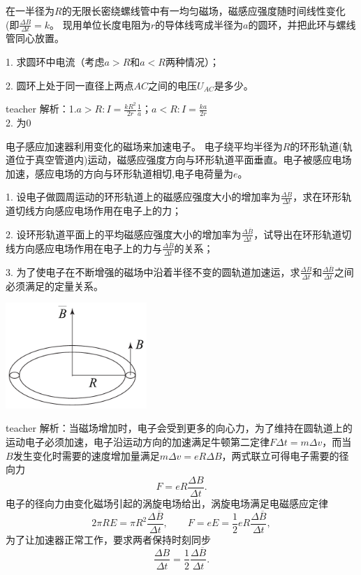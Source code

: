 \begin{example}
在一半径为$R$的无限长密绕螺线管中有一均匀磁场，磁感应强度随时间线性变化(即$\frac{\Delta B}{\Delta t} = k$。
现用单位长度电阻为$r $的导体线弯成半径为$a$的圆环，并把此环与螺线管同心放置。

1. 求圆环中电流（考虑$a>R $和$a<R $两种情况）；

2. 圆环上处于同一直径上两点$AC$之间的电压$U_{AC}$是多少。



\begin{taggedblock}{teacher}
\noindent
解析：1.$a>R:I=\frac{kR^2}{2r}\frac{1}{a}；a<R:I=\frac{ka}{2r}$
\\2. 为0
\end{taggedblock}
\end{example}


\begin{example}
电子感应加速器利用变化的磁场来加速电子。
电子绕平均半径为$R$的环形轨道(轨道位于真空管道内)运动，磁感应强度方向与环形轨道平面垂直。电子被感应电场加速，感应电场的方向与环形轨道相切,电子电荷量为$e$。

1. 设电子做圆周运动的环形轨道上的磁感应强度大小的增加率为$\frac{\Delta B}{\Delta t}$，求在环形轨道切线方向感应电场作用在电子上的力；

2. 设环形轨道平面上的平均磁感应强度大小的增加率为$\frac{\Delta \overline{B}}{\Delta t}$，试导出在环形轨道切线方向感应电场作用在电子上的力与$\frac{\Delta \overline{B}}{\Delta t}$的关系；

3. 为了使电子在不断增强的磁场中沿着半径不变的圆轨道加速运，求$\frac{\Delta B}{\Delta t}$和$\frac{\Delta \overline{B}}{\Delta t}$之间必须满足的定量关系。

\begin{flushright}
\includegraphics[width = 0.4\textwidth]{images/mag-33.pdf} 
\end{flushright}
\begin{taggedblock}{teacher}
\noindent
解析：当磁场增加时，电子会受到更多的向心力，为了维持在圆轨道上的运动电子必须加速，电子沿运动方向的加速满足牛顿第二定律$F\Delta t = m\Delta v$，而当$B$发生变化时需要的速度增加量满足$m\Delta v = eR\Delta B$，两式联立可得电子需要的径向力
\[
F = eR\frac{\Delta B}{\Delta t}.
\]
电子的径向力由变化磁场引起的涡旋电场给出，涡旋电场满足电磁感应定律
\[
2\pi R E = \pi R^2\frac{\Delta \overline{B}}{\Delta t},\qquad F = eE = \frac{1}{2}eR\frac{\Delta \overline{B}}{\Delta t},
\]
为了让加速器正常工作，要求两者保持时刻同步
\[
\frac{\Delta B}{\Delta t}=\frac{1}{2}\frac{\Delta \overline{B}}{\Delta t}.
\]
\end{taggedblock}
\end{example}

